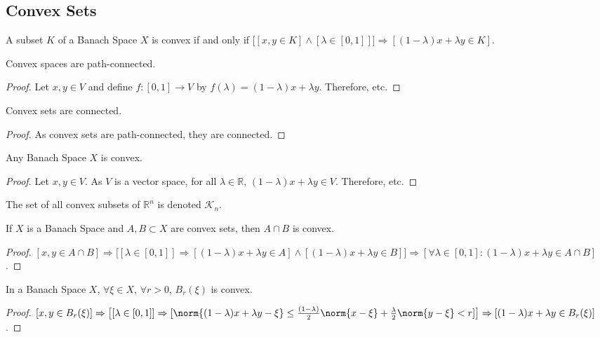 \documentclass[crop=false,class=book]{standalone}
\begin{document}
\subsection{Convex Sets}
\begin{definition}
A subset $K$ of a Banach Space $X$ is convex if and only if $\big[[x,y\in K]\land  [\lambda \in [0,1]]\big]\Rightarrow[(1-\lambda)x+\lambda y\in K]$.
\end{definition}
\begin{theorem}
Convex spaces are path-connected.
\end{theorem}
\begin{proof}
Let $x,y\in V$ and define $f:[0,1]\rightarrow V$ by $f(\lambda) = (1-\lambda)x+\lambda y$. Therefore, etc.
\end{proof}
\begin{corollary}
Convex sets are connected.
\end{corollary}
\begin{proof}
As convex sets are path-connected, they are connected.
\end{proof}
\begin{theorem}
Any Banach Space $X$ is convex.
\end{theorem}
\begin{proof}
Let $x,y\in V$. As $V$ is a vector space, for all $\lambda \in \mathbb{R}$, $(1-\lambda)x+\lambda y\in V$. Therefore, etc.
\end{proof}
\begin{notation}
The set of all convex subsets of $\mathbb{R}^n$ is denoted $\mathscr{K}_n$.
\end{notation}
\begin{theorem}
If $X$ is a Banach Space and $A,B\subset X$ are convex sets, then $A\cap B$ is convex.
\end{theorem}
\begin{proof}
$[x,y \in A\cap B] \Rightarrow \big[[\lambda \in [0,1]]\Rightarrow[ (1-\lambda)x+\lambda y \in A]\land [ (1-\lambda)x+\lambda y \in B]\big] \Rightarrow [\forall \lambda \in [0,1]:(1-\lambda)x+\lambda y \in A\cap B]$. 
\end{proof}
\begin{lemma}
In a Banach Space $X$, $\forall \xi \in X$, $\forall r>0$, $B_{r}(\xi)$ is convex.
\end{lemma}
\begin{proof}
$[x,y\in B_{r}(\xi)]\Rightarrow\big[[\lambda \in [0,1]]\Rightarrow [\norm{(1-\lambda)x+\lambda y-\xi}\leq \frac{(1-\lambda)}{2}\norm{x-\xi}+\frac{\lambda}{2} \norm{y-\xi}< r]\big]\Rightarrow [(1-\lambda)x+\lambda y \in B_{r}(\xi)]$.
\end{proof}
\end{document}
